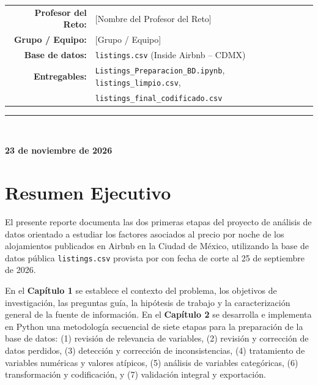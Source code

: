 \documentclass[12pt,letterpaper,oneside]{report}
\newcommand{\Profesor}{[Nombre del Profesor del Reto]} %
\newcommand{\Grupo}{[Grupo / Equipo]}                 %
\newcommand{\FechaEntrega}{23 de noviembre de 2026}    %
\begin{document}
\begin{titlepage}
  \vspace{0.65cm}

  \small
  \begin{tabular}{rl}
    \textbf{\color{NavyPrimary}Profesor del Reto:} & \Profesor \\[3pt]
    \textbf{\color{NavyPrimary}Grupo / Equipo:}    & \Grupo \\[3pt]
    \textbf{\color{NavyPrimary}Base de datos:}     & \texttt{listings.csv} (Inside Airbnb -- CDMX) \\[3pt]
    \textbf{\color{NavyPrimary}Entregables:}       & \texttt{Listings\_Preparacion\_BD.ipynb}, \texttt{listings\_limpio.csv}, \\
                                                   & \texttt{listings\_final\_codificado.csv} \\
  \end{tabular}

  \vfill
  {\color{NavyPrimary}\rule{\textwidth}{0.8pt}}\\[6pt]
  {\normalsize\textbf{\FechaEntrega}\par}
\end{titlepage}


\chapter*{Resumen Ejecutivo}

El presente reporte documenta las dos primeras etapas del proyecto de análisis de datos orientado a estudiar los factores asociados al precio por noche de los alojamientos publicados en Airbnb en la Ciudad de México, utilizando la base de datos pública \texttt{listings.csv} provista por \citet{insideairbnb2026} con fecha de corte al 25 de septiembre de 2026.

En el \textbf{Capítulo 1} se establece el contexto del problema, los objetivos de investigación, las preguntas guía, la hipótesis de trabajo y la caracterización general de la fuente de información. En el \textbf{Capítulo 2} se desarrolla e implementa en Python una metodología secuencial de siete etapas para la preparación de la base de datos: (1) revisión de relevancia de variables, (2) revisión y corrección de datos perdidos, (3) detección y corrección de inconsistencias, (4) tratamiento de variables numéricas y valores atípicos, (5) análisis de variables categóricas, (6) transformación y codificación, y (7) validación integral y exportación.
\end{document}
